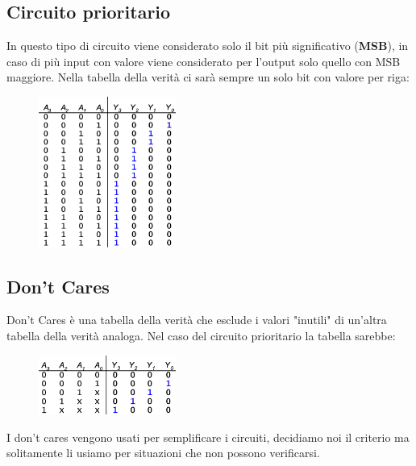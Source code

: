 \documentclass[../main.tex]{subfiles}
\begin{document}
\pagebreak
\subsection{Circuito prioritario}
In questo tipo di circuito viene considerato solo il bit più significativo (\textbf{MSB}), in caso di più input con valore 
viene considerato per l'output solo quello con MSB maggiore. Nella tabella della verità ci sarà sempre un solo 
bit con valore  per riga:
\begin{figure}[h]
    \centering
    \includegraphics[width=0.4\textwidth]{images/circuitoPrioritario.png}
\end{figure}

\subsection{Don't Cares}
Don't Cares è una tabella della verità che esclude i valori "inutili" di un'altra tabella della verità analoga. Nel caso del circuito
prioritario la tabella sarebbe:
\begin{figure}[h]
    \centering
    \includegraphics[width=0.4\textwidth]{images/dontCares.png}
\end{figure}

I don't cares vengono usati per semplificare i circuiti, decidiamo noi il criterio ma solitamente li usiamo per situazioni che non
possono verificarsi.
\end{document}
